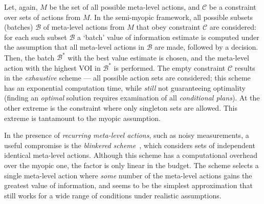 Let, again, $M$ be the set of all possible meta-level actions, and
${\mathcal C}$ be a constraint over sets of actions from $M$. In the
semi-myopic framework, all possible subsets (batches) ${\mathcal B}$
of meta-level actions from $M$ that obey constraint ${\mathcal C}$ are
considered: for each such subset ${\mathcal B}$ a `batch' value of
information estimate is computed under the assumption that all
meta-level actions in ${\mathcal B}$ are made, followed by a decision.
Then, the batch ${\mathcal B}^*$ with the best
value estimate is chosen, and the meta-level action with the highest
VOI in ${\mathcal B}^*$ is performed.  The empty constraint $\mathcal
C$ results in the {\em exhaustive} scheme --- all possible action sets
are considered; this scheme has an exponential computation time, while
{\em still} not guaranteeing optimality (finding an
\emph{optimal} solution requires examination of all \emph{conditional plans}).
At the other extreme is the constraint where only singleton sets are
allowed. This extreme is tantamount to the myopic assumption.

In the presence of \textit{recurring meta-level actions}, such as
noisy measurements, a useful compromise is the \textit{blinkered
scheme}~\cite{TolpinShimony.blinkered}, which considers sets of
independent identical meta-level actions.  Although this scheme has a
computational overhead over the myopic one, the factor is only linear
in the budget.  The scheme selects a single meta-level action where
{\em some} number of the meta-level actions gains the greatest value
of information, and seems to be the simplest approximation that still
works for a wide range of conditions under realistic assumptions.
